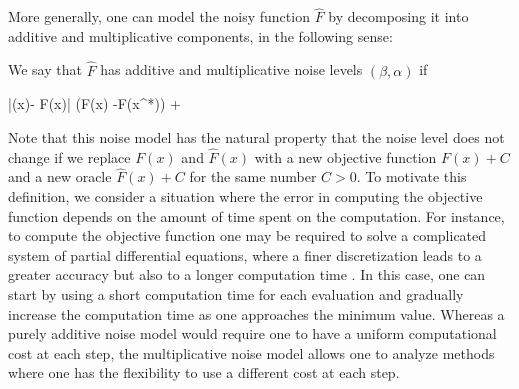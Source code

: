 \documentclass[final,12pt]{colt2018} %
\def \be{\begin{equs}}
\def \ee{\end{equs}}
\begin{document}
{ %
{More generally, one can model the noisy function $\hat{F}$ by decomposing it into additive and multiplicative components, in the following sense:
 \begin{definition} \label{def:noise_both2}
We say that $\hat{F}$ has additive and multiplicative noise  levels $(\beta, \alpha)$ if
\be \label{eq:model_add_mult2}
|(x)- F(x)| \leq \alpha(F(x) -F(x^{*})) + \beta
\ee
\end{definition}}
%
\noindent
{Note that this noise model has the natural property that the noise level does not change if we replace $F(x)$ and $\hat{F}(x)$ with a new objective function $F(x) + C$ and a new oracle $\hat{F}(x) + C$ for the same number $C>0$.}
%
%
%
\noindent
To motivate this definition, we consider a situation where the error in computing the objective function depends on the amount of time spent on the computation.  For instance, to compute the objective function one may be required to solve a complicated system of partial differential equations, where a finer discretization leads to a greater accuracy but also to a longer computation time \citep{conrad2018parallel, cliffe2011multilevel}.  In this case, one can start by using a short computation time for each evaluation and gradually increase the computation time as one approaches the minimum value.  Whereas a purely additive noise model would require one to have a uniform computational cost at each step, the multiplicative noise model allows one to analyze methods where one has the flexibility to use a different cost at each step.

}
\end{document}
